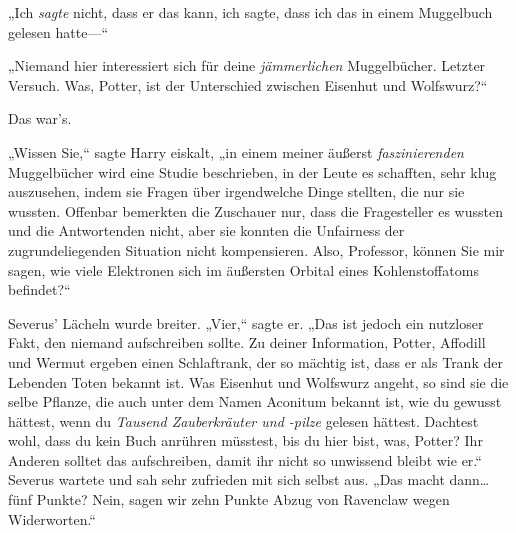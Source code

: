 „Ich \emph{sagte} nicht, dass er das kann, ich sagte, dass ich das in einem Muggelbuch gelesen hatte—“

„Niemand hier interessiert sich für deine \emph{jämmerlichen} Muggelbücher. Letzter Versuch. Was, Potter, ist der Unterschied zwischen Eisenhut und Wolfswurz?“

Das war’s.

„Wissen Sie,“ sagte Harry eiskalt, „in einem meiner äußerst \emph{faszinierenden} Muggelbücher wird eine Studie beschrieben, in der Leute es schafften, sehr klug auszusehen, indem sie Fragen über irgendwelche Dinge stellten, die nur sie wussten. Offenbar bemerkten die Zuschauer nur, dass die Fragesteller es wussten und die Antwortenden nicht, aber sie konnten die Unfairness der zugrundeliegenden Situation nicht kompensieren. Also, Professor, können Sie mir sagen, wie viele Elektronen sich im äußersten Orbital eines Kohlenstoffatoms befindet?“

Severus’ Lächeln wurde breiter. „Vier,“ sagte er. „Das ist jedoch ein nutzloser Fakt, den niemand aufschreiben sollte. Zu deiner Information, Potter, Affodill und Wermut ergeben einen Schlaftrank, der so mächtig ist, dass er als Trank der Lebenden Toten bekannt ist. Was Eisenhut und Wolfswurz angeht, so sind sie die selbe Pflanze, die auch unter dem Namen Aconitum bekannt ist, wie du gewusst hättest, wenn du \emph{Tausend Zauberkräuter und -pilze} gelesen hättest. Dachtest wohl, dass du kein Buch anrühren müsstest, bis du hier bist, was, Potter? Ihr Anderen solltet das aufschreiben, damit ihr nicht so unwissend bleibt wie er.“ Severus wartete und sah sehr zufrieden mit sich selbst aus. „Das macht dann…fünf Punkte? Nein, sagen wir zehn Punkte Abzug von Ravenclaw wegen Widerworten.“

